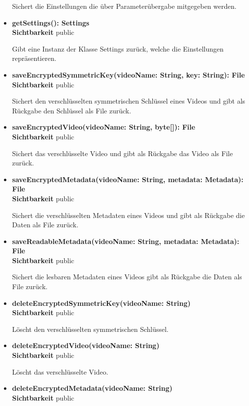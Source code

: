 \begin{itemize}
Sichert die Einstellungen die über Parameterübergabe mitgegeben werden.

\item \textbf{getSettings(): Settings}\hfill\\
\textbf{Sichtbarkeit} public

Gibt eine Instanz der Klasse Settings zurück, welche die Einstellungen repräsentieren.

\item \textbf{saveEncryptedSymmetricKey(videoName: String, key: String): File}\hfill\\
\textbf{Sichtbarkeit} public

Sichert den verschlüsselten symmetrischen Schlüssel eines Videos und gibt als Rückgabe den Schlüssel als File zurück. 

\item \textbf{saveEncryptedVideo(videoName: String, byte[]): File}\hfill\\
\textbf{Sichtbarkeit} public

Sichert das verschlüsselte Video und gibt als Rückgabe das Video als File zurück.

\item \textbf{saveEncryptedMetadata(videoName: String, metadata: Metadata): File}\hfill\\
\textbf{Sichtbarkeit} public

Sichert die verschlüsselten Metadaten eines Videos und gibt als Rückgabe die Daten als File zurück.

\item \textbf{saveReadableMetadata(videoName: String, metadata: Metadata): File}\hfill\\
\textbf{Sichtbarkeit} public

Sichert die lesbaren Metadaten eines Videos gibt als Rückgabe die Daten als File zurück.

\item \textbf{deleteEncryptedSymmetricKey(videoName: String)}\hfill\\
\textbf{Sichtbarkeit} public

Löscht den verschlüsselten symmetrischen Schlüssel.

\item \textbf{deleteEncryptedVideo(videoName: String)}\hfill\\
\textbf{Sichtbarkeit} public

Löscht das verschlüsselte Video.

\item \textbf{deleteEncryptedMetadata(videoName: String)}\hfill\\
\textbf{Sichtbarkeit} public


\end{itemize}
